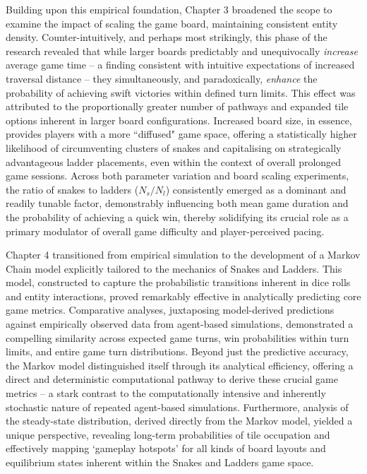 Building upon this empirical foundation, Chapter 3 broadened the scope to examine the impact of scaling the game board, maintaining consistent entity density. Counter-intuitively, and perhaps most strikingly, this phase of the research revealed that while larger boards predictably and unequivocally \textit{increase} average game time – a finding consistent with intuitive expectations of increased traversal distance – they simultaneously, and paradoxically, \textit{enhance} the probability of achieving swift victories within defined turn limits.  This effect was attributed to the proportionally greater number of pathways and expanded tile options inherent in larger board configurations.  Increased board size, in essence, provides players with a more ``diffused" game space, offering a statistically higher likelihood of circumventing clusters of snakes and capitalising on strategically advantageous ladder placements, even within the context of overall prolonged game sessions.  Across both parameter variation and board scaling experiments, the ratio of snakes to ladders ($N_s/N_l$) consistently emerged as a dominant and readily tunable factor, demonstrably influencing both mean game duration and the probability of achieving a quick win, thereby solidifying its crucial role as a primary modulator of overall game difficulty and player-perceived pacing.

Chapter 4 transitioned from empirical simulation to the development of a Markov Chain model explicitly tailored to the mechanics of Snakes and Ladders.  This model, constructed to capture the probabilistic transitions inherent in dice rolls and entity interactions, proved remarkably effective in analytically predicting core game metrics.  Comparative analyses, juxtaposing model-derived predictions against empirically observed data from agent-based simulations, demonstrated a compelling similarity across expected game turns, win probabilities within turn limits, and entire game turn distributions.  Beyond just the predictive accuracy, the Markov model distinguished itself through its analytical efficiency, offering a direct and deterministic computational pathway to derive these crucial game metrics – a stark contrast to the computationally intensive and inherently stochastic nature of repeated agent-based simulations. Furthermore, analysis of the steady-state distribution, derived directly from the Markov model, yielded a unique perspective, revealing long-term probabilities of tile occupation and effectively mapping ‘gameplay hotspots’ for all kinds of board layouts and equilibrium states inherent within the Snakes and Ladders game space.

